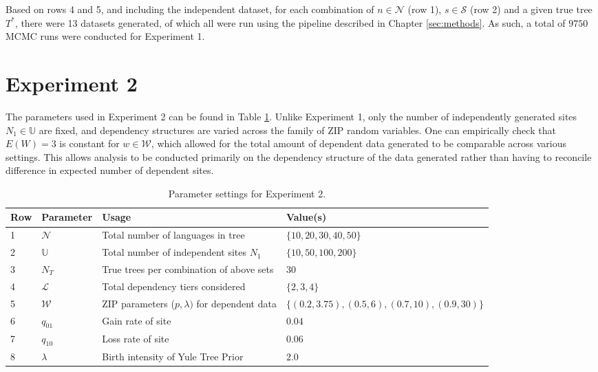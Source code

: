 Based on rows 4 and 5, and including the independent dataset, for each combination of $n \in \mathcal{N}$ (row 1), $s \in \mathcal{S}$ (row 2) and a given true tree $T^*$, there were 13 datasets generated, of which all were run using the pipeline described in Chapter \ref{sec:methods}. As such, a total of $9750$ MCMC runs were conducted for Experiment 1.


\section{Experiment 2}
The parameters used in Experiment 2 can be found in Table \ref{tab:exp2para}. Unlike Experiment 1, only the number of independently generated sites $N_1 \in \mathbb{U}$ are fixed, and dependency structures are varied across the family of ZIP random variables. One can empirically check that $E(W) = 3$ is constant for $w\in\mathcal{W}$, which allowed for the total amount of dependent data generated to be comparable across various settings. This allows analysis to be conducted primarily on the dependency structure of the data generated rather than having to reconcile difference in expected number of dependent sites.
\begin{table}[htbp]
\centering
\label{tab:experiment2_parameters}
\begin{tabular}{llll}

\hline
Row & Parameter & Usage & Value(s) \\
\hline
1 & $\mathcal{N}$ & Total number of languages in tree & $\{10,20,30,40,50\}$ \\
2 & $\mathbb{U}$ & Total number of independent sites $N_1$ & $\{10,50,100,200\}$ \\
3 & $N_T$ & True trees per combination of above sets & $30$ \\
4 & $\mathcal{L}$ & Total dependency tiers considered & $\{2,3,4\}$ \\
5 & $\mathcal{W}$ & ZIP parameters ($p, \lambda)$ for dependent data & $\{(0.2,3.75),(0.5,6),(0.7,10),(0.9,30)\}$ \\
6 & $q_{01}$ & Gain rate of site & $0.04$ \\
7 & $q_{10}$ & Loss rate of site & $0.06$ \\
8 & $\lambda$ & Birth intensity of Yule Tree Prior & $2.0$ \\
\hline
\end{tabular}
\caption{Parameter settings for Experiment 2.}
\label{tab:exp2para}
\end{table}

